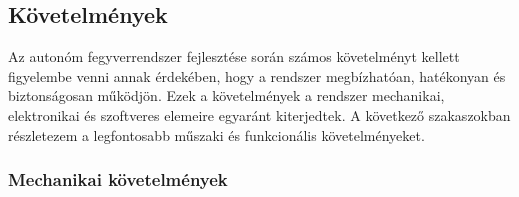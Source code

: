 \documentclass[12pt,a4paper]{article}
\begin{document}
\subsection{Követelmények}\label{sec:kov}

%
%
%
%

Az autonóm fegyverrendszer fejlesztése során számos követelményt kellett figyelembe venni annak érdekében, hogy a rendszer megbízhatóan, hatékonyan és biztonságosan működjön. Ezek a követelmények a rendszer mechanikai, elektronikai és szoftveres elemeire egyaránt kiterjedtek. A következő szakaszokban részletezem a legfontosabb műszaki és funkcionális követelményeket.

\subsubsection*{Mechanikai követelmények} 
\end{document}
